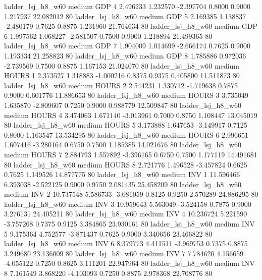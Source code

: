      ladder_lsj_h8_w60     medium      GDP                 4  2.496233 1.232570 -2.397704 0.8000 0.9000  1.217937   22.082012 80
     ladder_lsj_h8_w60     medium      GDP                 5  2.169385 1.138837 -2.480179 0.7625 0.8875  1.231960   21.764634 80
     ladder_lsj_h8_w60     medium      GDP                 6  1.997562 1.068227 -2.581507 0.7500 0.9000  1.218894   21.499365 80
     ladder_lsj_h8_w60     medium      GDP                 7  1.904009 1.014699 -2.666174 0.7625 0.9000  1.193334   21.258823 80
     ladder_lsj_h8_w60     medium      GDP                 8  1.785886 0.972036 -2.739569 0.7500 0.8875  1.167153   21.024070 80
     ladder_lsj_h8_w60     medium    HOURS                 1  2.373527 1.318883 -1.000216 0.8375 0.9375  0.405800   11.511873 80
     ladder_lsj_h8_w60     medium    HOURS                 2  2.544231 1.330712 -1.719638 0.7875 0.9000  0.601776   11.886653 80
     ladder_lsj_h8_w60     medium    HOURS                 3  3.735049 1.635870 -2.809607 0.7250 0.9000  0.988779   12.509847 80
     ladder_lsj_h8_w60     medium    HOURS                 4  3.474063 1.671140 -3.013961 0.7000 0.8750  1.108447   13.045019 80
     ladder_lsj_h8_w60     medium    HOURS                 5  3.173888 1.647653 -3.149917 0.7125 0.8000  1.163547   13.534295 80
     ladder_lsj_h8_w60     medium    HOURS                 6  2.996651 1.607416 -3.280164 0.6750 0.7500  1.185385   14.021676 80
     ladder_lsj_h8_w60     medium    HOURS                 7  2.884793 1.557892 -3.396165 0.6750 0.7500  1.177119   14.491681 80
     ladder_lsj_h8_w60     medium    HOURS                 8  2.721776 1.496528 -3.457824 0.6625 0.7625  1.149526   14.877775 80
     ladder_lsj_h8_w60     medium      INV                 1 11.596466 6.393038 -2.522125 0.9000 0.9750  2.081435   25.458209 80
     ladder_lsj_h8_w60     medium      INV                 2 10.737548 5.586733 -3.081059 0.8125 0.9250  2.570289   24.886295 80
     ladder_lsj_h8_w60     medium      INV                 3 10.959643 5.563049 -3.524158 0.7875 0.9000  3.276131   24.405211 80
     ladder_lsj_h8_w60     medium      INV                 4 10.236724 5.221590 -3.757268 0.7375 0.9125  3.384865   23.930161 80
     ladder_lsj_h8_w60     medium      INV                 5  9.175364 4.752577 -3.871437 0.7625 0.9000  3.340656   23.466822 80
     ladder_lsj_h8_w60     medium      INV                 6  8.379773 4.411511 -3.969753 0.7375 0.8875  3.249680   23.136009 80
     ladder_lsj_h8_w60     medium      INV                 7  7.784620 4.156659 -4.055122 0.7250 0.8625  3.111201   22.947964 80
     ladder_lsj_h8_w60     medium      INV                 8  7.161549 3.868220 -4.103093 0.7250 0.8875  2.978368   22.708776 80
